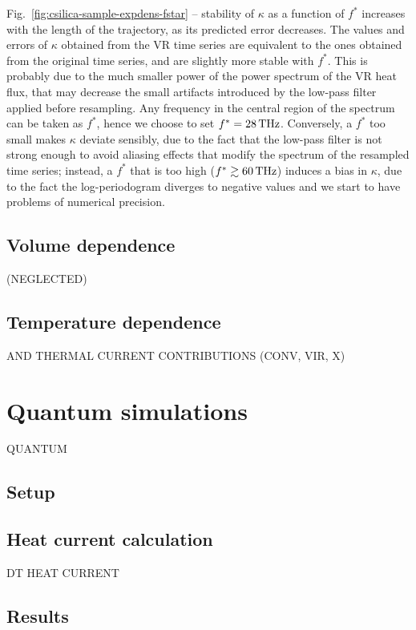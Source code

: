 Fig.~\ref{fig:csilica-sample-expdens-fstar} -- stability of $\kappa$ as a function of $f^*$ increases with the length of the trajectory, as its predicted error decreases. The values and errors of $\kappa$ obtained from the VR time series are equivalent to the ones obtained from the original time series, and are slightly more stable with $f^*$. This is probably due to the much smaller power of the power spectrum of the VR heat flux, that may decrease the small artifacts introduced by the low-pass filter applied before resampling. 
Any frequency in the central region of the spectrum can be taken as $f^*$, hence we choose to set $f^*=28\,\mathrm{THz}$. Conversely, a $f^*$ too small makes $\kappa$ deviate sensibly, due to the fact that the low-pass filter is not strong enough to avoid aliasing effects that modify the spectrum of the resampled time series; instead, a $f^*$ that is too high ($f^*\gtrsim 60\,\mathrm{THz}$) induces a bias in $\kappa$, due to the fact the log-periodogram diverges to negative values and we start to have problems of numerical precision.



\subsection{Volume dependence}
(NEGLECTED)

\subsection{Temperature dependence}
AND THERMAL CURRENT CONTRIBUTIONS (CONV, VIR, X)


\section{Quantum simulations}  \label{sec:results-quantum}
QUANTUM

\subsection{Setup}  \label{sec:results-quantum-setup}

\subsection{Heat current calculation}  \label{sec:results-quantum-current}
DT HEAT CURRENT

\subsection{Results}  \label{sec:results-quantum-results}
